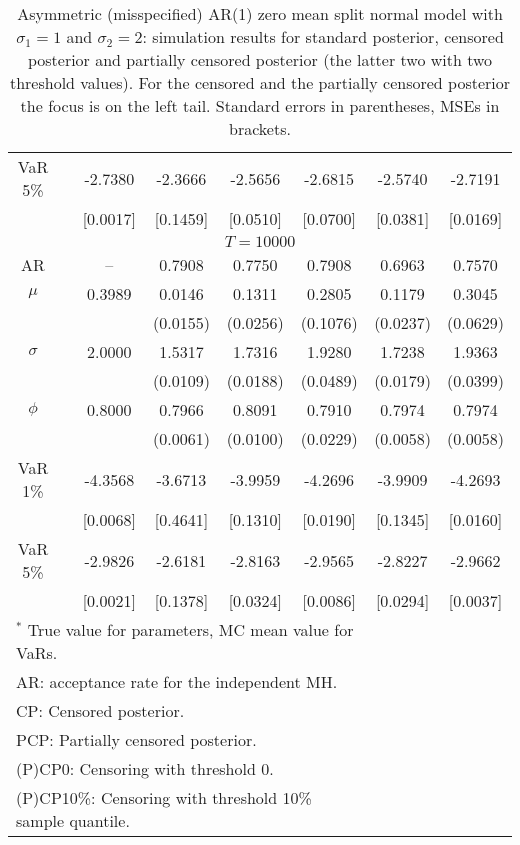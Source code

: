 {\begin{table}
\begin{tabular}{cc cccccc}
VaR 5\% && -2.7380 & -2.3666 & -2.5656 & -2.6815 & -2.5740 & -2.7191 \\ 
 && [0.0017] & [0.1459] & [0.0510] & [0.0700] & [0.0381] & [0.0169] \\ 
\hline 
\multicolumn{8}{c}{$T =10000$}  \\ 
\hline 
AR && -- & 0.7908 & 0.7750 & 0.7908 & 0.6963 & 0.7570 \\  
$\mu$&& 0.3989 & 0.0146 & 0.1311 & 0.2805 & 0.1179 & 0.3045 \\ 
&&   & (0.0155) & (0.0256) & (0.1076) & (0.0237) & (0.0629) \\ 
$\sigma$&& 2.0000 & 1.5317 & 1.7316 & 1.9280 & 1.7238 & 1.9363 \\ 
&&   & (0.0109) & (0.0188) & (0.0489) & (0.0179) & (0.0399) \\ 
$\phi$&& 0.8000 & 0.7966 & 0.8091 & 0.7910 & 0.7974 & 0.7974 \\ 
&&   & (0.0061) & (0.0100) & (0.0229) & (0.0058) & (0.0058) \\ 
VaR 1\% && -4.3568 & -3.6713 & -3.9959 & -4.2696 & -3.9909 & -4.2693 \\ 
  && [0.0068] & [0.4641] & [0.1310] & [0.0190] & [0.1345] & [0.0160] \\ 
VaR 5\% && -2.9826 & -2.6181 & -2.8163 & -2.9565 & -2.8227 & -2.9662 \\ 
 && [0.0021] & [0.1378] & [0.0324] & [0.0086] & [0.0294] & [0.0037] \\ 
\hline 
\multicolumn{6}{l}{\footnotesize{$^*$ True value for parameters, MC mean value for VaRs.}}  \\ 
\multicolumn{6}{l}{\footnotesize{AR: acceptance rate for the independent MH.}}  \\ 
\multicolumn{6}{l}{\footnotesize{CP: Censored posterior.}}  \\ 
\multicolumn{6}{l}{\footnotesize{PCP: Partially censored posterior.}} \\ 
\multicolumn{6}{l}{\footnotesize{(P)CP0: Censoring with threshold 0.}} \\ 
\multicolumn{6}{l}{\footnotesize{(P)CP10\%: Censoring with threshold 10\% sample quantile.}}  \\ 
\end{tabular}
 \caption{Asymmetric (misspecified) AR(1) zero mean split normal model with $\sigma_{1}=1$ and $\sigma_{2}=2$: simulation results for standard posterior, censored posterior and partially censored posterior (the latter two with two threshold values). For the censored and the partially censored posterior the focus is on the left tail. Standard errors in parentheses, MSEs in brackets.} 
\label{tab:ar1_pcp}  
\end{table}
}